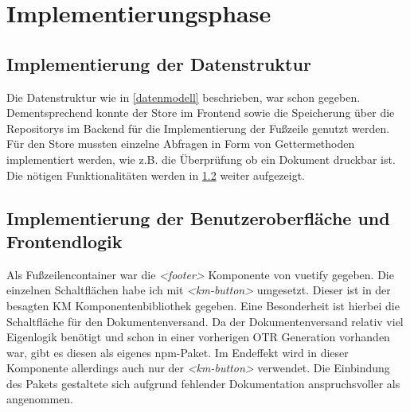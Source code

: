 \section{Implementierungsphase}
\label{implementierungsphase}

\subsection{Implementierung der Datenstruktur}
\label{datenstruktur}
Die Datenstruktur wie in \ref{datenmodell}  beschrieben, war schon gegeben. Dementsprechend konnte der Store im Frontend sowie die Speicherung über die Repositorys im Backend für die Implementierung der Fußzeile genutzt werden.\\
Für den Store mussten einzelne Abfragen in Form von Gettermethoden implementiert werden, wie z.B. die Überprüfung ob ein Dokument druckbar ist. Die nötigen Funktionalitäten werden in \ref{oberflacheimplemetieren}  weiter aufgezeigt.
\subsection{Implementierung der Benutzeroberfläche und Frontendlogik}
\label{oberflacheimplemetieren}
Als Fußzeilencontainer war die \textit{<footer>} Komponente von \gls{vuetify} gegeben. Die einzelnen Schaltflächen habe ich mit \textit{<km-button>} umgesetzt. Dieser ist in der besagten \ac{KM} Komponentenbibliothek gegeben. Eine Besonderheit ist hierbei die Schaltfläche für den Dokumentenversand. Da der Dokumentenversand relativ viel Eigenlogik benötigt und schon in einer vorherigen \ac{OTR} Generation vorhanden war, gibt es diesen als eigenes \gls{npm}-Paket. Im Endeffekt wird in dieser Komponente allerdings auch nur der \textit{<km-button>} verwendet. Die Einbindung des Pakets gestaltete sich aufgrund fehlender Dokumentation anspruchsvoller als angenommen.\\

